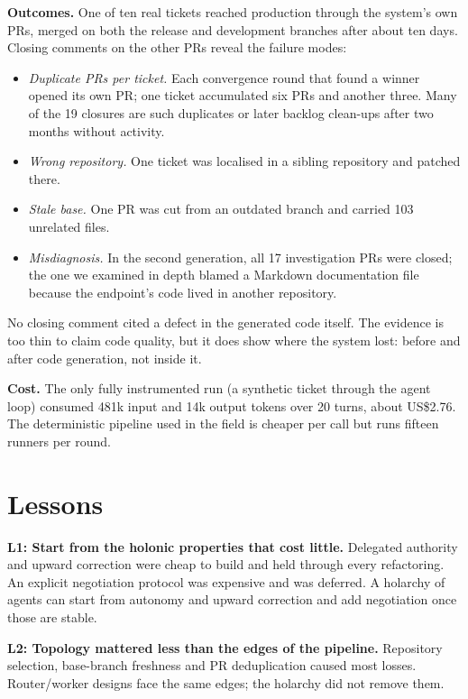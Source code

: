 \documentclass[conference]{IEEEtran}
\begin{document}
\textbf{Outcomes.} One of ten real tickets reached production through the
system's own PRs, merged on both the release and development branches after
about ten days.
Closing comments on the other PRs reveal the failure modes:
\begin{itemize}
  \item \emph{Duplicate PRs per ticket.} Each convergence round that found a
        winner opened its own PR; one ticket accumulated six PRs and another
        three. Many of the 19 closures are such duplicates or later
        backlog clean-ups after two months without activity.
  \item \emph{Wrong repository.} One ticket was localised in a sibling
        repository and patched there.
  \item \emph{Stale base.} One PR was cut from an outdated branch and carried
        103 unrelated files.
  \item \emph{Misdiagnosis.} In the second generation, all 17 investigation
        PRs were closed; the one we examined in depth blamed a Markdown
        documentation file because the endpoint's code lived in another
        repository.
\end{itemize}
No closing comment cited a defect in the generated code itself. The
evidence is too thin to claim code quality, but it does show where the
system lost: before and after code generation, not inside it.

\textbf{Cost.} The only fully instrumented run (a synthetic ticket through
the agent loop) consumed 481k input and 14k output tokens over 20 turns,
about US\$2.76. The deterministic pipeline used in the field is cheaper per
call but runs fifteen runners per round.

\section{Lessons}
\label{sec:lessons}

\textbf{L1: Start from the holonic properties that cost little.} Delegated
authority and upward correction were cheap to build and held through every
refactoring. An explicit negotiation protocol was expensive and was
deferred. A holarchy of agents can start from autonomy and upward
correction and add negotiation once those are stable.

\textbf{L2: Topology mattered less than the edges of the pipeline.}
Repository selection, base-branch freshness and PR deduplication caused most
losses. Router/worker designs \cite{deepseek2026superagent} face the same
edges; the holarchy did not remove them.
\end{document}

